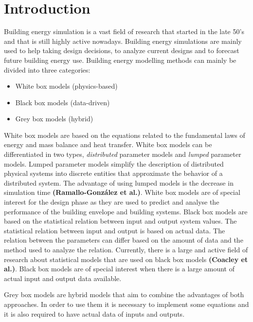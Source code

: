
\section{Introduction}

Building energy simulation is a vast field of research that started in the late 50’s and that is still highly active nowadays. Building energy simulations are mainly used to help taking design decisions, to analyze current designs and to forecast future building energy use. Building energy modelling methods can mainly be divided into three categories:
\begin{itemize}
  
    \item White box models (physics-based)
    \item Black box models (data-driven)
    \item Grey box models (hybrid)

\end{itemize}


White box models are based on the equations related to the fundamental laws of energy and mass balance and heat transfer. White box models can be differentiated in two types, \emph{distributed} parameter models and \emph{lumped} parameter models. Lumped parameter models simplify the description of distributed physical systems into discrete entities that approximate the behavior of a distributed system. The advantage of using lumped models is the decrease in simulation time \textbf{(Ramallo-González et al.\cite{Alfonso})}. White box models are of special interest for the design phase as they are used to predict and analyse the performance of the building envelope and building systems.
Black box models are based on the statistical relation between input and output system values. The statistical relation between input and output is based on actual data. The relation between the parameters can differ based on the amount of data and the method used to analyze the relation. Currently, there is a large and active field of research about statistical models that are used on black box models \textbf{(Coacley et al.\cite{Coakley})}. Black box models are of special interest when there is a large amount of actual input and output data available. 

Grey box models are hybrid models that aim to combine the advantages of both approaches. In order to use them it is necessary to implement some equations and it is also required to have actual data of inputs and outputs.

\newpage
